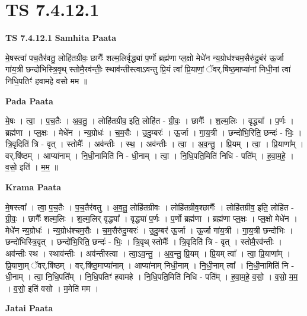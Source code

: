 \documentclass[17pt]{extarticle}
\begin{document}
\section{ TS 7.4.12.1 }

\textbf{TS 7.4.12.1 } \newline
\textbf{Samhita Paata} \newline

मे॒षस्त्वा॑ पच॒तैर॑वतु॒ लोहि॑तग्रीवः॒ छागैः᳚ शल्म॒लिर्वृद्ध्या॑ प॒र्णो ब्रह्म॑णा प्ल॒क्षो मेधे॑न न्य॒ग्रोध॑श्चम॒सैरु॑दु॒बंर॑ ऊ॒र्जा गा॑य॒त्री छन्दो॑भिस्त्रि॒वृथ् स्तोमै॒रव॑न्तीः॒ स्थाव॑न्तीस्त्वाऽवन्तु प्रि॒यं त्वा᳚ प्रि॒याणां॒ ॅवर्.षि॑ष्ठ॒माप्या॑नां निधी॒नां त्वा॑ निधि॒पतिꣳ॑ हवामहे वसो मम ॥ \newline

\textbf{Pada Paata} \newline

मे॒षः । त्वा॒ । प॒च॒तैः । अ॒व॒तु॒ । लोहि॑तग्रीव॒ इति॒ लोहि॑त - ग्री॒वः॒ । छागैः᳚ । श॒ल्म॒लिः । वृद्ध्या᳚ । प॒र्णः । ब्रह्म॑णा । प्ल॒क्षः । मेधे॑न । न्य॒ग्रोधः॑ । च॒म॒सैः । उ॒दु॒म्बरः॑ । ऊ॒र्जा । गा॒य॒त्री । छन्दो॑भि॒रिति॒ छन्दः॑ - भिः॒ । त्रि॒वृदिति॑ त्रि - वृत् । स्तोमैः᳚ । अव॑न्तीः । स्थ॒ । अव॑न्तीः । त्वा॒ । अ॒व॒न्तु॒ । प्रि॒यम् । त्वा॒ । प्रि॒याणा᳚म् । वर्.षि॑ष्ठम् । आप्या॑नाम् । नि॒धी॒नामिति॑ नि - धी॒नाम् । त्वा॒ । नि॒धि॒पति॒मिति॑ निधि - पति᳚म् । ह॒वा॒म॒हे॒ । व॒सो॒ इति॑ । म॒म॒ ॥  \newline


\textbf{Krama Paata} \newline

मे॒षस्त्वा᳚ । त्वा॒ प॒च॒तैः । प॒च॒तैर॑वतु । अ॒व॒तु॒ लोहि॑तग्रीवः । लोहि॑तग्रीव॒श्छागैः᳚ । लोहि॑तग्रीव॒ इति॒ लोहि॑त - ग्री॒वः॒ । छागैः᳚ शल्म॒लिः । श॒ल्म॒लिर् वृद्ध्या᳚ । वृद्ध्या॑ प॒र्णः । प॒र्णो ब्रह्म॑णा । ब्रह्म॑णा प्ल॒क्षः । प्ल॒क्षो मेधे॑न । मेधे॑न न्य॒ग्रोधः॑ । न्य॒ग्रोध॑श्चम॒सैः । च॒म॒सैरु॑दु॒म्बरः॑ । उ॒दु॒म्बर॑ ऊ॒र्जा । ऊ॒र्जा गा॑य॒त्री । गा॒य॒त्री छन्दो॑भिः । छन्दो॑भिस्त्रि॒वृत् । छन्दो॑भि॒रिति॒ छन्दः॑ - भिः॒ । त्रि॒वृथ् स्तोमैः᳚ । त्रि॒वृदिति॑ त्रि - वृत् । स्तोमै॒रव॑न्तीः । अव॑न्तीः स्थ । स्थाव॑न्तीः । अव॑न्तीस्त्वा । त्वा॒ऽव॒न्तु॒ । अ॒व॒न्तु॒ प्रि॒यम् । प्रि॒यम् त्वा᳚ । त्वा॒ प्रि॒याणा᳚म् । प्रि॒याणा॒म् ॅवर्.षि॑ष्ठम् । वर्.षि॑ष्ठ॒माप्या॑नाम् । आप्या॑नाम् निधी॒नाम् । नि॒धी॒नाम् त्वा᳚ । नि॒धी॒नामिति॑ नि - धी॒नाम् । त्वा॒ नि॒धि॒पति᳚म् । नि॒धि॒पतिꣳ॑ हवामहे । नि॒धि॒पति॒मिति॑ निधि - पति᳚म् । ह॒वा॒म॒हे॒ व॒सो॒ । व॒सो॒ म॒म॒ । व॒सो॒ इति॑ वसो । म॒मेति॑ मम । \newline

\textbf{Jatai Paata} \newline
\end{document}
